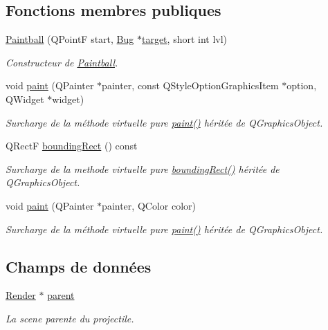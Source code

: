 \subsection*{Fonctions membres publiques}
\begin{DoxyCompactItemize}
\item 
\hyperlink{classPaintball_a49fb3e83330128d0456f54235f0fd557}{Paintball} (QPointF start, \hyperlink{classBug}{Bug} $\ast$\hyperlink{classProjectile_ae5273bd2c6550b94f38310b69859b093}{target}, short int lvl)
\begin{DoxyCompactList}\small\item\em Constructeur de \hyperlink{classPaintball}{Paintball}. \end{DoxyCompactList}\item 
void \hyperlink{classPaintball_a7cab2d49d3e63731595b86c7cb939171}{paint} (QPainter $\ast$painter, const QStyleOptionGraphicsItem $\ast$option, QWidget $\ast$widget)
\begin{DoxyCompactList}\small\item\em Surcharge de la méthode virtuelle pure \hyperlink{classPaintball_a7cab2d49d3e63731595b86c7cb939171}{paint()} héritée de QGraphicsObject. \end{DoxyCompactList}\item 
QRectF \hyperlink{classProjectile_a0e0b18909c9c154404384707c6515802}{boundingRect} () const 
\begin{DoxyCompactList}\small\item\em Surcharge de la methode virtuelle pure \hyperlink{classProjectile_a0e0b18909c9c154404384707c6515802}{boundingRect()} héritée de QGraphicsObject. \end{DoxyCompactList}\item 
void \hyperlink{classProjectile_aef0d6ffcea7620988cf5446d0c1133fa}{paint} (QPainter $\ast$painter, QColor color)
\begin{DoxyCompactList}\small\item\em Surcharge de la méthode virtuelle pure \hyperlink{classProjectile_aef0d6ffcea7620988cf5446d0c1133fa}{paint()} héritée de QGraphicsObject. \end{DoxyCompactList}\end{DoxyCompactItemize}
\subsection*{Champs de données}
\begin{DoxyCompactItemize}
\item 
\hyperlink{classRender}{Render} $\ast$ \hyperlink{classProjectile_a04924a3bccf3393aaa0f57d9384f617d}{parent}
\begin{DoxyCompactList}\small\item\em La scene parente du projectile. \end{DoxyCompactList}\end{DoxyCompactItemize}
